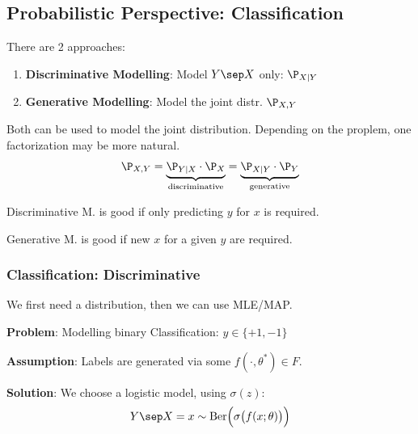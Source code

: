 \subsection{Probabilistic Perspective: Classification}

There are 2 approaches:

\begin{enumerate}
    \item \textbf{Discriminative Modelling}: Model $Y\sep X$ only: $\P_{X|Y}$\\
    \item \textbf{Generative Modelling}: Model the joint distr. $\P_{X,Y}$\\
\end{enumerate}

Both can be used to model the joint distribution. Depending on the proplem, one factorization may be more natural.
$$
    \P_{X,Y} = \underbrace{\P_{Y|X}\cdot\P_X}_\text{discriminative} = \underbrace{\P_{X|Y}\cdot\P_Y}_\text{generative}
$$
{\footnotesize
    \remark Discriminative M. is good if only predicting $y$ for $x$ is required.

    \remark Generative M. is good if new $x$ for a given $y$ are required.
}

\newpage

\subsubsection{Classification: Discriminative}

We first need a distribution, then we can use MLE/MAP.

\textbf{Problem}: Modelling binary Classification: $y \in \{+1,-1\}$

\textbf{Assumption}: Labels are generated via some $f(\cdot,\theta^*) \in F$.\\

\textbf{Solution}: We choose a logistic model, using $\sigma(z)$:\\
$$
    Y\sep X = x \sim \text{Ber}\Bigl( \sigma\bigl( f(x;\theta) \bigr) \Bigr)
$$

